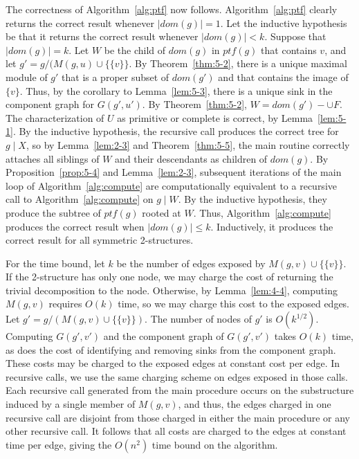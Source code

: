 The correctness of Algorithm~\ref{alg:ptf} now follows.
Algorithm~\ref{alg:ptf} clearly returns the correct result whenever $\mid dom(g) \mid = 1$.
Let the inductive hypothesis be that it returns the correct result whenever $\mid dom(g) \mid < k$.
Suppose that $\mid dom(g) \mid = k$.
Let $W$ be the child of $dom(g)$ in $ptf(g)$ that contains $v$, and let $g' = g/(M(g,u) \cup \{\{v\}\}$.
By Theorem~\ref{thm:5-2}, there is a unique maximal module of $g'$ that is a proper subset of $dom(g')$ and that contains the image of $\{v\}$.
Thus, by the corollary to Lemma~\ref{lem:5-3}, there is a unique sink in the component graph for $G(g',u')$.
By Theorem~\ref{thm:5-2}, $W = dom(g') - \cup F$.
The characterization of $U$ as primitive or complete is correct, by Lemma~\ref{lem:5-1}.
By the inductive hypothesis, the recursive call produces the correct tree for $g \mid X$, so by Lemma~\ref{lem:2-3} and Theorem~\ref{thm:5-5}, the main routine correctly attaches all siblings of $W$ and their descendants as children of $dom(g)$.
By Proposition~\ref{prop:5-4} and Lemma~\ref{lem:2-3}, subsequent iterations of the main loop of Algorithm~\ref{alg:compute} are computationally equivalent to a recursive call to Algorithm~\ref{alg:compute} on $g \mid W$.
By the inductive hypothesis, they produce the subtree of $ptf(g)$ rooted at $W$.
Thus, Algorithm~\ref{alg:compute} produces the correct result when $\mid dom(g) \mid \leq k$.
Inductively, it produces the correct result for all symmetric 2-structures.

For the time bound, let $k$ be the number of edges exposed by $M(g, v) \cup \{\{v\}\}$.
If the 2-structure has only one node, we may charge the cost of returning the trivial decomposition to the node.
Otherwise, by Lemma~\ref{lem:4-4}, computing $M(g, v)$ requires $O(k)$ time, so we may charge this cost to the exposed edges.
Let $g' = g/(M(g, v) \cup \{\{v\}\})$.
The number of nodes of $g'$ is $O(k^{1/2})$.
Computing $G(g',v')$ and the component graph of $G(g', v')$ takes $O(k)$ time, as does the cost of identifying and removing sinks from the component graph.
These costs may be charged to the exposed edges at constant cost per edge.
In recursive calls, we use the same charging scheme on edges exposed in those calls.
Each recursive call generated from the main procedure occurs on the substructure induced by a single member of $M(g, v)$, and thus, the edges charged in one recursive call are disjoint from those charged in either the main procedure or any other recursive call.
It follows that all costs are charged to the edges at constant time per edge, giving the $O(n^2)$ time bound on the algorithm.



